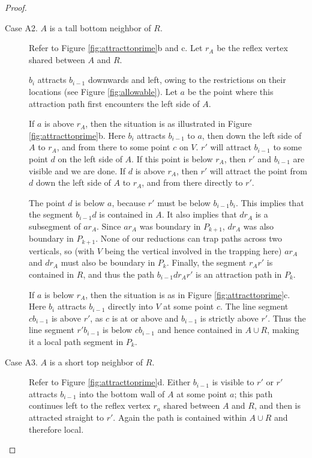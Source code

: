 \documentclass{article}
\begin{document}
\begin{proof}
\begin{description}
		\item[Case A2. $A$ is a tall bottom neighbor of $R$.]
			Refer to Figure \ref{fig:attracttoprime}b and c.
			Let $r_A$ be the reflex vertex shared between $A$ and $R$.

			
			$b_i$ attracts $b_{i-1}$ downwards and left,
			owing to the restrictions on their locations (see Figure
			\ref{fig:allowable}).
			Let $a$ be the point where this attraction path first encounters the left
			side of $A$.
			
			If $a$ is above $r_A$, then the situation is as illustrated in Figure
			\ref{fig:attracttoprime}b.
			Here $b_i$ attracts $b_{i-1}$ to $a$, then down the left side of $A$
			to $r_A$, and from there to some point $c$ on $V$.
			$r'$ will attract $b_{i-1}$ to some point $d$ on the left side of $A$.
			If this point is below $r_A$, then $r'$ and $b_{i-1}$ are visible and we
			are done. If $d$ is above $r_A$, then $r'$ will attract the point from $d$
			down the left side of $A$ to $r_A$, and from there directly to $r'$.
			
			The point $d$ is below $a$, because $r'$ must be below $b_{i-1}b_i$.
			This implies that the segment $b_{i-1}d$ is contained in $A$.
			It also implies that $dr_A$ is a subsegment of $ar_A$.
			Since $ar_A$ was boundary in $P_{k+1}$, $dr_A$ was also boundary
			in $P_{k+1}$.
			None of our reductions can trap paths across two verticals, so (with $V$
			being the vertical involved in the trapping here) $ar_A$ and $dr_A$ must also
			be boundary in $P_k$.
			Finally, the segment $r_Ar'$ is contained in $R$, and thus the path
			$b_{i-1}dr_Ar'$ is an attraction path in $P_k$.
			
			
			If $a$ is below $r_A$,  then the situation is as in Figure
			\ref{fig:attracttoprime}c.
			Here $b_i$ attracts $b_{i-1}$ directly into $V$ at some point $c$.
			The line segment $cb_{i-1}$ is above $r'$, as $c$ is at or above and
			$b_{i-1}$ is strictly above $r'$.  Thus the line segment $r'b_{i-1}$ is
			below $cb_{i-1}$ and hence contained in $A \cup R$, making it a local path
			segment in $P_{k}$.

		
		\item[Case A3. $A$ is a short top neighbor of $R$.]
			Refer to Figure \ref{fig:attracttoprime}d. 
			Either $b_{i-1}$ is visible to $r'$
			or $r'$ attracts $b_{i-1}$ into the bottom wall of $A$ at some point $a$;
			this
			path continues left to the reflex vertex $r_a$ shared between $A$ and $R$,
			and then is attracted straight to $r'$.
			Again the path is contained within $A \cup R$ and therefore local.
		

\end{description}
\end{proof}
\end{document}
